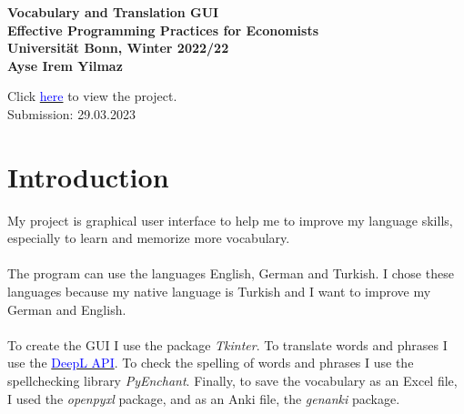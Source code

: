 \documentclass[11pt,a4paper,leqno]{article}
\begin{document}
    \begin{center}
        \begin{large}
            \textbf{
                Vocabulary and Translation GUI\\
                Effective Programming Practices for Economists\\
                Universität Bonn, Winter 2022/22\\[2ex]
                Ayse Irem Yilmaz\\}
        \end{large}
    \end{center}
    
    \begin{center}
        Click \href{https://github.com/irem-y/vocabulary_and_translation_gui}{\textcolor{blue}{here}} to view the project.\\
        Submission: 29.03.2023
    \end{center}
    
    \newpage

    \tableofcontents

    \newpage
    
    \section{Introduction}
    My project is graphical user interface to help me to improve my language skills, especially to learn and memorize more vocabulary.\\\\
    The program can use the languages English, German and Turkish.
    I chose these languages because my native language is Turkish and I want to improve my German and English.\\\\
    To create the GUI I use the package \emph{Tkinter}.
    To translate words and phrases I use the \href{https://github.com/DeepLcom/deepl-python}{\textcolor{blue}{DeepL API}}.
    To check the spelling of words and phrases I use the spellchecking library \emph{PyEnchant}.
    Finally, to save the vocabulary as an Excel file, I used the \emph{openpyxl} package, and as an Anki file, the \emph{genanki} package.
    
    \newpage
    
\end{document}
